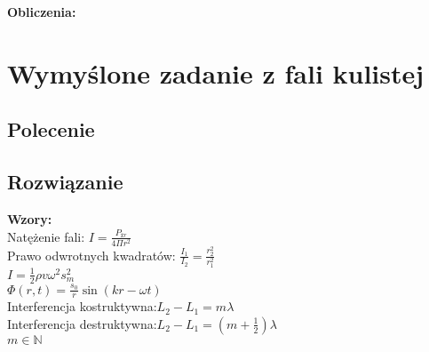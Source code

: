 \documentclass[a4paper,14pt]{extarticle}  %
\begin{document}
                \textbf{Obliczenia:}\\
    \section{Wymyślone zadanie z fali kulistej}
        \subsection{Polecenie}
        \subsection{Rozwiązanie}
        \textbf{Wzory:}\\
        Natężenie fali: $I= \frac{P_{źr}}{4 \Pi r^2}$\\
        Prawo odwrotnych kwadratów: $\frac{I_1}{I_2}=\frac{r_2^2}{r_1^2}$\\
        $I=\frac{1}{2}\rho v \omega ^2 s_m^2$\\
        $\Phi (r,t)=\frac{s_0}{r}\sin (kr-\omega t)$\\
        Interferencja kostruktywna:$L_2-L_1=m\lambda$\\
        Interferencja destruktywna:$L_2-L_1=(m+\frac{1}{2})\lambda$\\
        $m \in \mathbb{N} $
\end{document}
